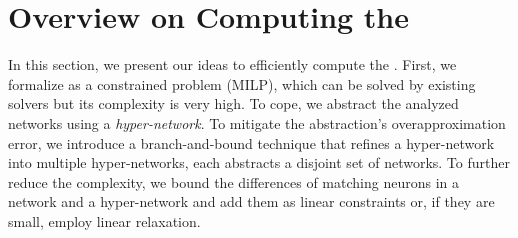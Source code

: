\section{Overview on Computing the \propa}
\label{sec:overview}
In this section, we present our ideas to efficiently compute the \propa. %
First, we formalize \propa as a constrained problem (MILP), which can be solved by existing solvers %
but its complexity is very high. %
To cope, we abstract the analyzed networks using a \emph{hyper-network}. To mitigate the abstraction's overapproximation error, we introduce a branch-and-bound technique that refines a hyper-network into multiple hyper-networks, each abstracts a disjoint set of networks. %
To further reduce the complexity, we bound the differences of matching neurons in a network and a hyper-network and %
add them as linear constraints or, if they are small, employ linear relaxation.

